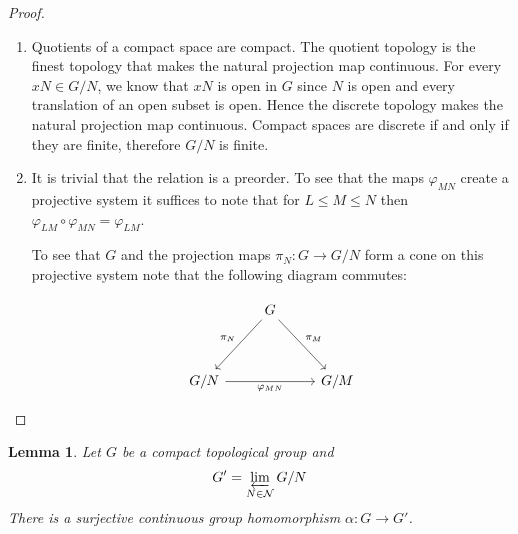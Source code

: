 \documentclass[12pt]{article}
\newtheorem{lem}[thm]{Lemma}
\theoremstyle{definition}
\theoremstyle{remark}
\newcommand*{\nor}{\mathcal{N}}
\begin{document}
    \begin{proof}
        \begin{enumerate}[label=(\alph*)]
            \item Quotients of a compact space are compact. The quotient topology is the finest topology that makes the natural projection map continuous. For every $xN\in G/N$, we know that $xN$ is open in $G$ since $N$ is open and every translation of an open subset is open. Hence the discrete topology makes the natural projection map continuous. Compact spaces are discrete if and only if they are finite, therefore $G/N$ is finite.
            \item It is trivial that the relation is a preorder. To see that the maps $\varphi_{MN}$ create a projective system it suffices to note that for $L\leq M\leq N$ then $\varphi_{LM}\circ\varphi_{MN}=\varphi_{LM}$.
            
            To see that $G$ and the projection maps $\pi_N\colon G\to G/N$ form a cone on this projective system note that the following diagram commutes:

            \[\begin{tikzcd}
                & G \\
                \\
                {G/N} && {G/M}
                \arrow["{\pi_N}"', from=1-2, to=3-1]
                \arrow["{\pi_M}", from=1-2, to=3-3]
                \arrow["{\varphi_{MN}}"', from=3-1, to=3-3]
            \end{tikzcd}\]
        \end{enumerate}
    \end{proof}

    \begin{lem}\label{lem:sur}
        Let $G$ be a compact topological group and $$G'=\varprojlim_{N\in\nor} G/N$$
        There is a surjective continuous group homomorphism $\alpha\colon G\to G'$.
    \end{lem}
\end{document}
